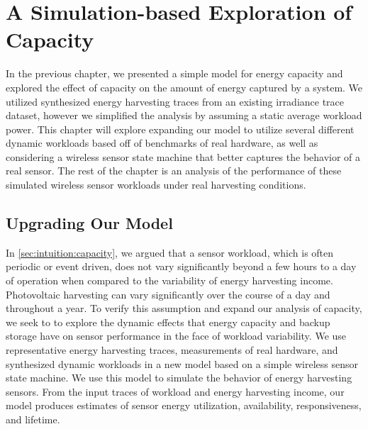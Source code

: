 \chapter{A Simulation-based Exploration of Capacity}
\label{cha:capacity}
In the previous chapter, we presented a simple model for energy capacity and explored the effect of capacity on the amount of energy captured by a system. 
We utilized synthesized energy harvesting traces from an existing irradiance trace dataset, however we simplified the analysis by assuming a static average workload power.
This chapter will explore expanding our model to utilize several different dynamic workloads based off of benchmarks of real hardware, as well as considering a wireless sensor state machine that better captures the behavior of a real sensor.
The rest of the chapter is an analysis of the performance of these simulated wireless sensor workloads under real harvesting conditions.

\section{Upgrading Our Model}
\label{sec:capacity:modelling}
In \cref{sec:intuition:capacity}, we argued that a sensor workload, which is often periodic or event driven, does not vary significantly beyond a few hours to a day of operation when compared to the variability of energy harvesting income. Photovoltaic harvesting can vary significantly over the course of a day and throughout a year. 
To verify this assumption and expand our analysis of capacity, we seek to to explore the dynamic effects that energy
capacity and backup storage have on sensor performance in the face of workload variability.
We use representative energy harvesting traces, measurements of real hardware,
and synthesized dynamic workloads in a new model based on a simple wireless sensor state machine.
We use this model to simulate
the behavior of energy harvesting sensors. 
From the input traces of workload and energy harvesting income, our model produces estimates of sensor energy utilization, availability, responsiveness, and lifetime.


